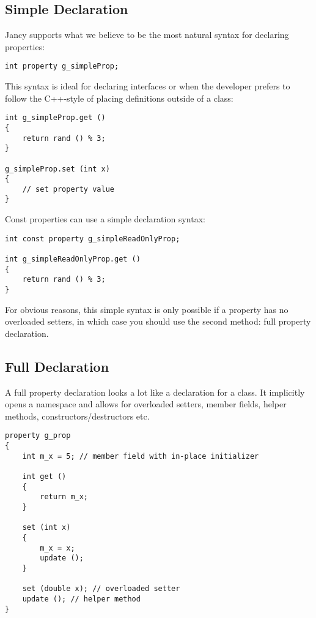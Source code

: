 \documentclass[oneside]{book}
\begin{document}
\subsection{Simple Declaration}

Jancy supports what we believe to be the most natural syntax for declaring properties:

\begin{lstlisting}
int property g_simpleProp;
\end{lstlisting}

This syntax is ideal for declaring interfaces or when the developer prefers to follow the C++-style of placing definitions outside of a class:

\begin{lstlisting}
int g_simpleProp.get ()
{
    return rand () % 3;
}

g_simpleProp.set (int x)
{
    // set property value
}
\end{lstlisting}

Const properties can use a simple declaration syntax:

\begin{lstlisting}
int const property g_simpleReadOnlyProp;

int g_simpleReadOnlyProp.get ()
{
    return rand () % 3;
}
\end{lstlisting}

For obvious reasons, this simple syntax is only possible if a property has no overloaded setters, in which case you should use the second method: full property declaration.

\subsection{Full Declaration}

A full property declaration looks a lot like a declaration for a class. It implicitly opens a namespace and allows for overloaded setters, member fields, helper methods, constructors/destructors etc.

\begin{lstlisting}
property g_prop
{
    int m_x = 5; // member field with in-place initializer

    int get ()
    {
        return m_x;
    }

    set (int x) 
    {
        m_x = x;
        update ();
    }   
        
    set (double x); // overloaded setter
    update (); // helper method
}
\end{lstlisting}
\end{document}
